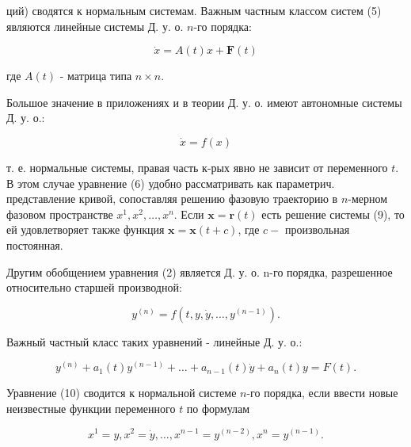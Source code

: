 \documentclass[10pt]{article}
\begin{document}
ций) сводятся к нормальным системам. Важным частным классом систем (5) являются линейные системы Д. у. о. $n$-го порядка:



\[

\dot{x}=A(t) x+\boldsymbol{F}(t)

\]



где $A(t)$ - матрица типа $n \times n$.



Большое значение в приложениях и в теории Д. у. о. имеют автономные системы Д. у. о.:



\[

\dot{x}=f(x)

\]



т. е. нормальные системы, правая часть к-рых явно не зависит от переменного $t$. В этом случае уравнение (6) удобно рассматривать как параметрич. представление кривой, сопоставляя решению фазовую траекторию в $n$-мерном фазовом пространстве $x^{1}, x^{2}, \ldots, x^{n}$. Если $\boldsymbol{x}=\boldsymbol{r}(t)$ есть решение системы (9), то ей удовлетворяет также функция $\boldsymbol{x}=\boldsymbol{x}(t+c)$, где $c-$ произвольная постоянная.



Другим обобщением уравнения (2) является Д. у. о. n-го порядка, разрешенное относительно старшей производной:



\[

y^{(n)}=f\left(t, y, \dot{y}, \ldots, y^{(n-1)}\right) .

\]



Важный частный класс таких уравнений - линейные Д. у. о.:



\[

y^{(n)}+a_{1}(t) y^{(n-1)}+\ldots+a_{n-1}(t) \dot{y}+a_{n}(t) y=F(t) .

\]



Уравнение (10) сводится к нормальной системе $n$-го порядка, если ввести новые неизвестные функции переменного $t$ по формулам



\[

x^{1}=y, x^{2}=\dot{y}, \ldots, x^{n-1}=y^{(n-2)}, x^{n}=y^{(n-1)} .

\]
\end{document}
